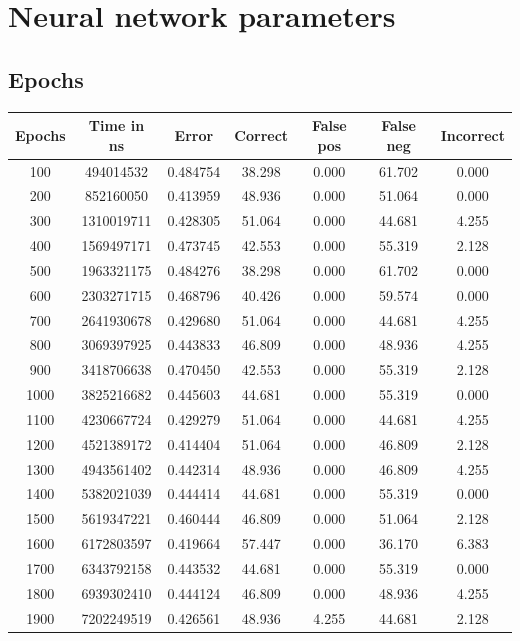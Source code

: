 \documentclass[12pt,a4,notitlepage]{report}
\renewcommand{\_}{\texttt{\symbol{95}}}
\newcommand{\<}{\texttt{\symbol{60}}}
\renewcommand{\>}{\texttt{\symbol{62}}}
\begin{document}
\section{Neural network parameters}

\subsection{Epochs}

\begin{tabular}{c|cccccc}
Epochs & Time in ns & Error & Correct & False pos & False neg & Incorrect \\ \hline
100 & 494014532 & 0.484754 & 38.298 & 0.000 & 61.702 & 0.000 \\
200 & 852160050 & 0.413959 & 48.936 & 0.000 & 51.064 & 0.000 \\
300 & 1310019711 & 0.428305 & 51.064 & 0.000 & 44.681 & 4.255 \\
400 & 1569497171 & 0.473745 & 42.553 & 0.000 & 55.319 & 2.128 \\
500 & 1963321175 & 0.484276 & 38.298 & 0.000 & 61.702 & 0.000 \\
600 & 2303271715 & 0.468796 & 40.426 & 0.000 & 59.574 & 0.000 \\
700 & 2641930678 & 0.429680 & 51.064 & 0.000 & 44.681 & 4.255 \\
800 & 3069397925 & 0.443833 & 46.809 & 0.000 & 48.936 & 4.255 \\
900 & 3418706638 & 0.470450 & 42.553 & 0.000 & 55.319 & 2.128 \\
1000 & 3825216682 & 0.445603 & 44.681 & 0.000 & 55.319 & 0.000 \\
1100 & 4230667724 & 0.429279 & 51.064 & 0.000 & 44.681 & 4.255 \\
1200 & 4521389172 & 0.414404 & 51.064 & 0.000 & 46.809 & 2.128 \\
1300 & 4943561402 & 0.442314 & 48.936 & 0.000 & 46.809 & 4.255 \\
1400 & 5382021039 & 0.444414 & 44.681 & 0.000 & 55.319 & 0.000 \\
1500 & 5619347221 & 0.460444 & 46.809 & 0.000 & 51.064 & 2.128 \\
1600 & 6172803597 & 0.419664 & 57.447 & 0.000 & 36.170 & 6.383 \\
1700 & 6343792158 & 0.443532 & 44.681 & 0.000 & 55.319 & 0.000 \\
1800 & 6939302410 & 0.444124 & 46.809 & 0.000 & 48.936 & 4.255 \\
1900 & 7202249519 & 0.426561 & 48.936 & 4.255 & 44.681 & 2.128 \\
\end{tabular}	
\end{document}
